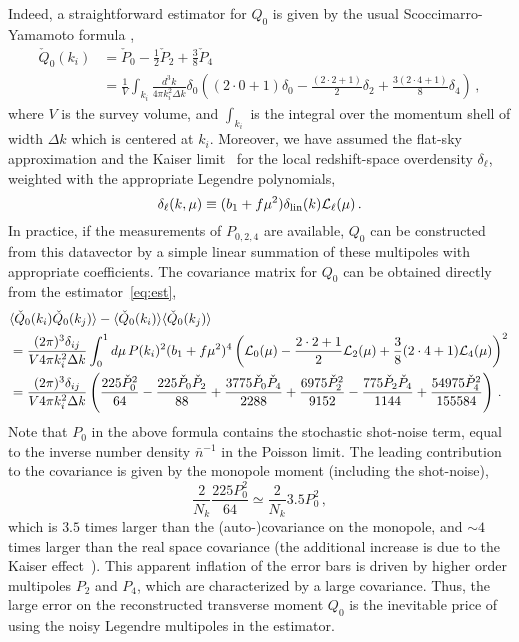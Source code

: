 \documentclass[12pt,a4paper]{article}
\newcommand{\be}{\begin{equation}}
\newcommand{\ee}{\end{equation}}
\begin{document}
Indeed, a straightforward estimator for $Q_0$ is given by the usual Scoccimarro-Yamamoto formula \cite{Scoccimarro:2015bla},
\be
\label{eq:est}
\begin{split}
\check Q_0(k_i)&=\check P_0-\frac{1}{2}\check P_2+\frac{3}{8}\check P_4 \\
&= \frac{1}{V}\int_{k_i}\frac{d^3k}{4\pi k_i^2 \Delta k}
\delta_0\left((2\cdot 0+1)\delta_0-\frac{(2\cdot 2+1)}{2}\delta_2+\frac{3(2\cdot 4+1)}{8}\delta_4\right)\,,
\end{split}
\ee
where $V$ is the survey volume, and $\int_{k_{i}}$ is the integral over the momentum shell of width $\Delta k$ which is centered at $k_i$.
Moreover, we have assumed the flat-sky approximation and the Kaiser limit~\cite{Kaiser:1987qv} 
for the local redshift-space overdensity $\delta_\ell$, weighted with the appropriate Legendre polynomials,
\be 
\delta_\ell(k,\mu) \equiv (b_1+f\mu^2)\delta_{\rm lin}(k){\cal L}_\ell (\mu)\,.
\ee 
In practice, if the measurements of $P_{0,2,4}$ are available, 
$Q_0$ can be constructed from this datavector by a simple linear summation of these multipoles with appropriate coefficients.
The covariance matrix for $Q_0$ can be obtained directly 
from the 
estimator~\eqref{eq:est},
\be 
\label{eq:covar}
\begin{split}
&\langle \check Q_0(k_i)\check Q_0(k_j)\rangle - \langle \check Q_0(k_i)\rangle \langle \check Q_0(k_j)\rangle \\
&= \frac{(2\pi)^3 \delta_{ij}}{V4\pi k_i^2 \Delta k}\int_0^1 d\mu\, P(k_i)^2 (b_1+f\mu^2)^4 \left(
{\cal L}_0(\mu)-\frac{2\cdot 2+1}{2}{\cal L}_2(\mu)+\frac{3}{8}(2\cdot 4+1){\cal L}_4(\mu)
\right)^2\,\\
&=\frac{(2\pi)^3 \delta_{ij}}{V4\pi k_i^2 \Delta k}\left(
\frac{225 \check{P}_0^2}{64}-\frac{225 \check{P}_0 \check{P}_2}{88}+\frac{3775 \check{P}_0 \check{P}_4}{2288}+\frac{6975 \check{P}_2^2}{9152}-\frac{775 \check{P}_2 \check{P}_4}{1144}+\frac{54975 \check{P}_4^2}{155584}
\right)\,.
\end{split}
\ee
Note that $P_0$ in the above formula contains the stochastic shot-noise term, 
equal to the inverse number density $\bar{n}^{-1}$ in the Poisson limit.
The leading contribution to the covariance is given by the monopole moment (including the shot-noise),
\be 
\frac{2}{N_k}\frac{225 P_0^2}{64}\simeq \frac{2}{N_k} 3.5 P_0^2\,,
\ee
which is $3.5$ times larger than the (auto-)covariance on the monopole, 
and $\sim 4$ times larger than the real 
space covariance (the additional increase is due to the Kaiser effect~\cite{Kaiser:1987qv}).
This apparent inflation of the error bars is driven by higher order multipoles $P_2$ and $P_4$,
which are characterized by a large covariance. 
Thus, the large error on the reconstructed transverse moment $Q_0$ is the inevitable price 
of using the noisy Legendre multipoles in the estimator. 
\end{document}

